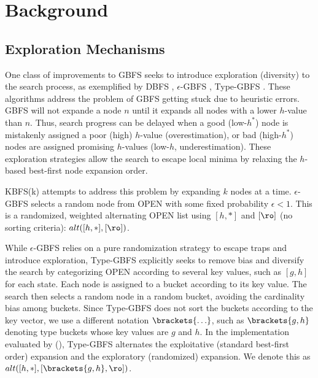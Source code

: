 \section{Background}

\subsection{Exploration Mechanisms}

One class of improvements to GBFS seeks to introduce exploration (diversity) to the search process, as exemplified by DBFS \cite{imai2011novel}, $\epsilon$-GBFS \cite{valenzano2014comparison}, Type-GBFS
\cite{xie14type}.
These algorithms address the problem of GBFS getting stuck due to heuristic errors.
GBFS will not expande a node $n$  until it expands all nodes with a lower $h$-value than $n$.
Thus, search progress can be delayed when a good (low-$h^*$) node is mistakenly assigned a poor (high) $h$-value (overestimation), or bad (high-$h^*$) nodes are assigned promising $h$-values (low-$h$, underestimation).
These exploration strategies allow the search to escape local minima by relaxing the $h$-based best-first node expansion order.

KBFS(k) \cite{felner2003kbfs} attempts to address this problem by expanding $k$ nodes at a time.
% 
% 
$\epsilon$-GBFS \cite{valenzano2014comparison} selects a random node from OPEN with some fixed probability $\epsilon <1$.
This is a randomized, weighted alternating 
OPEN list using $[h,*]$ and $[\ro]$ (no sorting criteria): $\mit{alt}([h,*],[\ro])$.

While $\epsilon$-GBFS relies on  a pure randomization strategy to escape traps and introduce exploration, 
Type-GBFS \cite{xie14type} explicitly seeks to remove bias and diversify the search  by categorizing OPEN according to several key values, such as $[g,h]$ for each state.
Each node is assigned to a bucket according to its key value.
The search then selects a random node in a random
bucket, avoiding the cardinality bias among buckets.
Since Type-GBFS does not sort the buckets according to the key vector, we use a different notation $\brackets{\ldots}$,
such as $\brackets{g,h}$ denoting type buckets whose key values are $g$ and $h$.
In the implementation evaluated by \citeauthor{xie14type} (\citeyear{xie14type}),
Type-GBFS alternates the exploitative (standard best-first order) expansion and the exploratory (randomized) expansion. We denote this 
 as $\mit{alt}([h,*], [\brackets{g,h},\ro])$.

